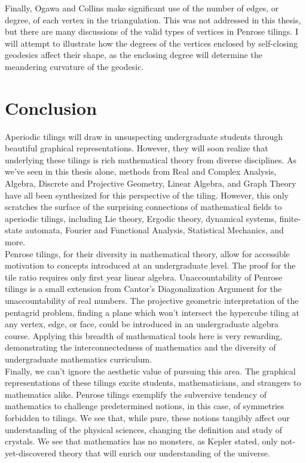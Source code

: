 \documentclass[
  oneside,
  11pt, a4paper,
  footinclude=true,
  headinclude=true,
  cleardoublepage=empty
]{scrbook}
\begin{document}
Finally, Ogawa and Collins make significant use of the number of edges, or degree, of each vertex in the triangulation. This was not addressed in this thesis, but there are many discussions of the valid types of vertices in Penrose tilings. I will attempt to illustrate how the degrees of the vertices enclosed by self-closing geodesics affect their shape, as the enclosing degree will determine the meandering curvature of the geodesic. 

\chapter{Conclusion}
Aperiodic tilings will draw in unsuspecting undergraduate students through beautiful graphical representations.  However, they will soon realize that underlying these tilings is rich mathematical theory from diverse disciplines. As we've seen in this thesis alone, methods from Real and Complex Analysis, Algebra, Discrete and Projective Geometry, Linear Algebra, and Graph Theory have all been synthesized for this perspective of the tiling. However, this only scratches the surface of the surprising connections of mathematical fields to aperiodic tilings, including Lie theory, Ergodic theory, dynamical systems, finite-state automata, Fourier and Functional Analysis, Statistical Mechanics, and more.\\
Penrose tilings, for their diversity in mathematical theory, allow for accessible motivation to concepts introduced at an undergraduate level. The proof for the tile ratio requires only first year linear algebra. Unaccountability of Penrose tilings is a small extension from Cantor's Diagonalization Argument for the unaccountability of real numbers. The projective geometric interpretation of the pentagrid problem, finding a plane which won't intersect the hypercube tiling at any vertex, edge, or face, could be introduced in an undergraduate algebra course. Applying this breadth of mathematical tools here is very rewarding, demonstrating the interconnectedness of mathematics and the diversity of undergraduate mathematics curriculum.\\
Finally, we can't ignore the aesthetic value of pursuing this area. The graphical representations of these tilings excite students, mathematicians, and strangers to mathematics alike. Penrose tilings exemplify the subversive tendency of mathematics to challenge predetermined notions, in this case, of symmetries forbidden to tilings. We see that, while pure, these notions tangibly affect our understanding of the physical sciences, changing the definition and study of crystals. We see that mathematics has no monsters, as Kepler stated, only not-yet-discovered theory that will enrich our understanding of the universe. 





    


\end{document}
